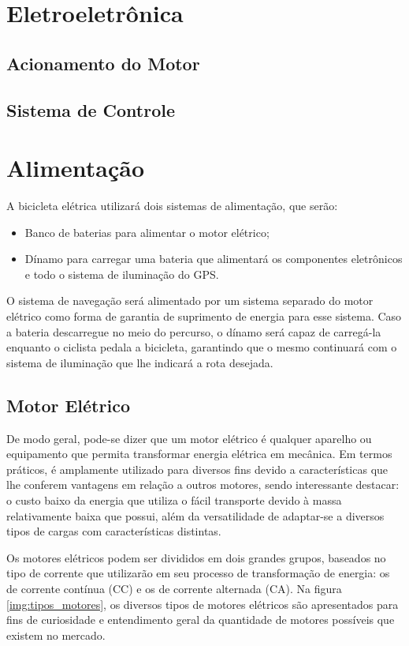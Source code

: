   \section{Eletroeletrônica}
  	\subsection{Acionamento do Motor}
  
 	 \subsection{Sistema de Controle}
  
  \section{Alimentação}
  A bicicleta elétrica utilizará dois sistemas de alimentação, que serão:
  \begin{itemize}
  	\item Banco de baterias para alimentar o motor elétrico;
  	\item Dínamo para carregar uma bateria que alimentará os componentes eletrônicos e todo o sistema de iluminação do GPS. 
  \end{itemize}
  
	O sistema de navegação será alimentado por um sistema separado do motor elétrico como forma de garantia de suprimento de energia para esse sistema. Caso a bateria descarregue no meio do percurso, o dínamo será capaz de carregá-la enquanto o ciclista pedala a bicicleta, garantindo que o mesmo continuará com o sistema de iluminação que lhe indicará a rota desejada.
	
	\subsection{Motor Elétrico}
De modo geral, pode-se dizer que um motor elétrico é qualquer aparelho ou equipamento que permita transformar energia elétrica em mecânica. Em termos práticos, é amplamente utilizado para diversos fins devido a características que lhe conferem vantagens em relação a outros motores, sendo interessante destacar: o custo baixo da energia que utiliza o fácil transporte devido à massa relativamente baixa que possui, além da versatilidade de adaptar-se a diversos tipos de cargas com características distintas.

Os motores elétricos podem ser divididos em dois grandes grupos, baseados no tipo de corrente que utilizarão em seu processo de transformação de energia: os de corrente contínua (CC) e os de corrente alternada (CA). Na figura \ref{img:tipos_motores}, os diversos tipos de motores elétricos são apresentados para fins de curiosidade e entendimento geral da quantidade de motores possíveis que existem no mercado.	

